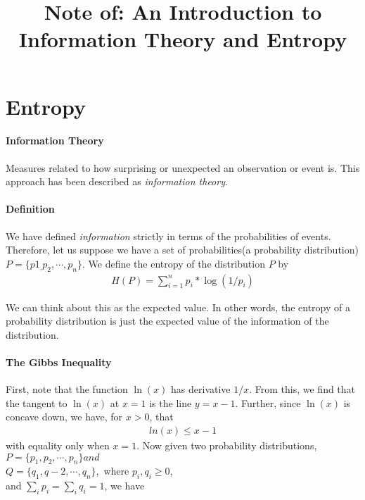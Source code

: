 \documentclass[10 pt,final]{article}
\title{Note of: An Introduction to Information Theory and Entropy}
\newcommand{\impo}[1]{{\color{magenta} #1}}
\begin{document}
\date{}

\maketitle



\section{Entropy}
\paragraph{Information Theory} Measures related to how surprising or unexpected an observation or event is. This approach has been described as \emph{information theory}.

\paragraph{Definition} We have defined \emph{information} strictly in terms of the probabilities of events. Therefore, let us suppose we have a set of probabilities(a probability distribution) $P=\{p1_,p_2, \cdots, p_n\}$. We define the entropy of the distribution $P$ by
\begin{align*}
H(P) = \sum^n_{i=1} p_i*\log{(1/p_i)}
\end{align*}

We can think about this as the expected value. In other words, the entropy of a probability distribution is just the expected value of the information of the distribution. 

\paragraph{\impo{The Gibbs Inequality}}
First, note that the function $\ln(x)$ has derivative $1/x$. From this, we find that the tangent to $\ln(x)$ at $x=1$ is the line $y=x-1$. Further, since $\ln(x)$ is concave down, we have, for $x >0$, that 
\begin{align*}
ln(x) \leq x -1
\end{align*}
with equality only when $x=1$. Now given two probability distributions,\\
$P=\{p_1, p_2, \cdots, p_n\} and $ \\
$Q=\{q_1, q-2, \cdots, q_n\},$ where $p_i, q_i \geq 0$, \\
and $\sum_i p_i = \sum_i q_i =1$, we have
\end{document}
